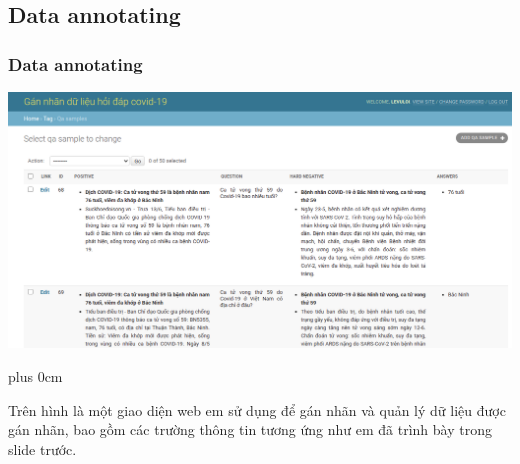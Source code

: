 \documentclass[11pt]{beamer}
\renewcommand{\raggedright}{\leftskip=0pt \rightskip=0pt plus 0cm}
\let\olditemize=\itemize
\renewenvironment{itemize}{\olditemize\raggedright}{\endlist}
\begin{document}
\subsection{Data annotating}
\begin{frame}
	\frametitle{Data annotating}
	\includegraphics[scale=.25]{images/annotate.png}
\end{frame}
\begin{frame}
\begin{itemize}
	\item Trên hình là một giao diện web em sử dụng để gán nhãn và quản lý dữ liệu được gán nhãn, bao gồm các trường thông tin tương ứng như em đã trình bày trong slide trước.
\end{itemize}
\end{frame}
\end{document}
